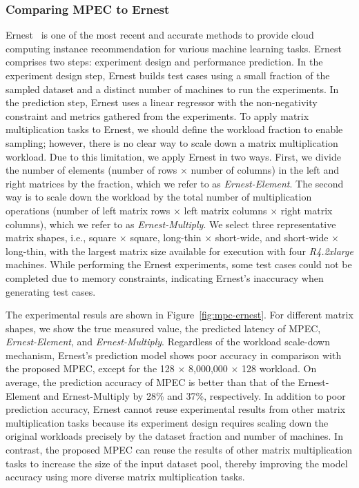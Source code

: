 \documentclass[10pt, conference, compsocconf]{IEEEtran}
\begin{document}
\subsubsection{Comparing MPEC to Ernest}
Ernest~\cite{ernest} is one of the most recent and accurate methods to provide cloud computing instance recommendation for various machine learning tasks. Ernest comprises two steps: experiment design and performance prediction. In the experiment design step, Ernest builds test cases using a small fraction of the sampled dataset and a distinct number of machines to run the experiments. In the prediction step, Ernest uses a linear regressor with the non-negativity constraint and metrics gathered from the experiments. To apply matrix multiplication tasks to Ernest, we should define the workload fraction to enable sampling; however, there is no clear way to scale down a matrix multiplication workload. Due to this limitation, we apply Ernest in two ways. First, we divide the number of elements (number of rows $\times$ number of columns) in the left and right matrices by the fraction, which we refer to as \textit{Ernest-Element}. The second way is to scale down the workload by the total number of multiplication operations (number of left matrix rows $\times$ left matrix columns $\times$ right matrix columns), which we refer to as \textit{Ernest-Multiply}. We select three representative matrix shapes, i.e., square $\times$ square, long-thin $\times$ short-wide, and short-wide $\times$ long-thin, with the largest matrix size available for execution with four \textit{R4.2xlarge} machines. While performing the Ernest experiments, some test cases could not be completed due to memory constraints, indicating Ernest's inaccuracy when generating test cases.

The experimental resuls are shown in Figure~\ref{fig:mpc-ernest}. For different matrix shapes, we show the true measured value, the predicted latency of MPEC, \textit{Ernest-Element}, and \textit{Ernest-Multiply}. Regardless of the workload scale-down mechanism, Ernest's prediction model shows poor accuracy in comparison with the proposed MPEC, except for the 128 $\times$ 8,000,000 $\times$ 128 workload. On average, the prediction accuracy of MPEC is better than that of the Ernest-Element and Ernest-Multiply by 28\% and 37\%, respectively. In addition to poor prediction accuracy, Ernest cannot reuse experimental results from other matrix multiplication tasks because its experiment design requires scaling down the original workloads precisely by the dataset fraction and number of machines. In contrast, the proposed MPEC can reuse the results of other matrix multiplication tasks to increase the size of the input dataset pool, thereby improving the model accuracy using more diverse matrix multiplication tasks.
\end{document}
